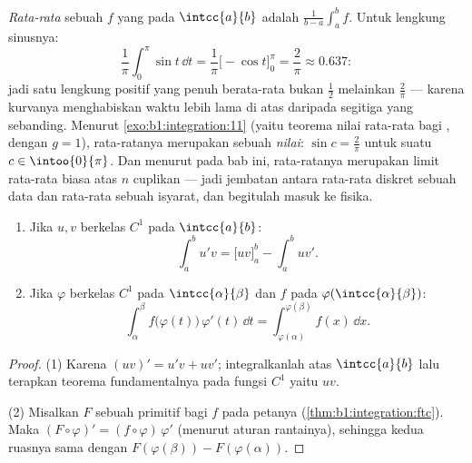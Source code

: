 \begin{example}\label{ex:b1:integration:average}
\emph{Rata-rata} sebuah $f$ yang  pada $\intcc{a}{b}$ adalah
$\frac{1}{b-a}\int_a^b f$. Untuk lengkung sinusnya:
\[
\frac{1}{\pi}\int_0^\pi \sin t\,\dd t
= \frac{1}{\pi}\bigl[-\cos t\bigr]_0^\pi = \frac{2}{\pi}
\approx 0.637 :
\]
jadi satu lengkung positif yang penuh berata-rata bukan $\frac12$ melainkan
$\frac2\pi$ --- karena kurvanya menghabiskan waktu lebih lama di atas daripada segitiga
yang sebanding. Menurut \cref{exo:b1:integration:11} (yaitu teorema nilai rata-rata bagi
, dengan $g = 1$), rata-ratanya merupakan sebuah \emph{nilai}: $\sin c =
\frac2\pi$ untuk suatu $c \in \intoo{0}{\pi}$. Dan menurut  pada bab ini, rata-ratanya merupakan limit rata-rata biasa
atas $n$ cuplikan --- jadi jembatan antara rata-rata diskret
sebuah data dan rata-rata  sebuah isyarat, dan begitulah
 masuk ke fisika.
\end{example}

\begin{theorem}\label{thm:b1:integration:parts}
\begin{enumerate}
  \item Jika $u, v$ berkelas $C^1$ pada $\intcc{a}{b}$:
        \[
        \int_a^b u'v = \bigl[uv\bigr]_a^b - \int_a^b uv' .
        \]
  \item Jika $\varphi$ berkelas $C^1$ pada $\intcc{\alpha}{\beta}$ dan $f$
         pada $\varphi(\intcc{\alpha}{\beta})$:
        \[
        \int_{\alpha}^{\beta} f\bigl(\varphi(t)\bigr)\,\varphi'(t)\,
        \dd t = \int_{\varphi(\alpha)}^{\varphi(\beta)} f(x)\, \dd x .
        \]
\end{enumerate}
\end{theorem}

\begin{proof}
(1) Karena $(uv)' = u'v + uv'$; integralkanlah atas $\intcc{a}{b}$ lalu terapkan
teorema fundamentalnya pada fungsi $C^1$ yaitu $uv$.

(2) Misalkan $F$ sebuah primitif bagi $f$ pada  petanya
(\cref{thm:b1:integration:ftc}). Maka $(F \circ \varphi)' = (f
\circ \varphi)\,\varphi'$ (menurut aturan rantainya), sehingga kedua ruasnya sama dengan
$F(\varphi(\beta)) - F(\varphi(\alpha))$.
\end{proof}

